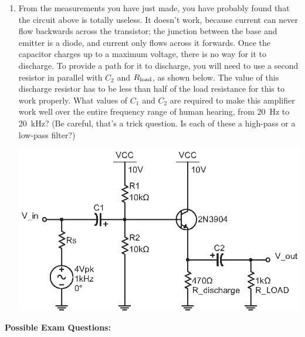 \begin{enumerate}[wide]
\item From the measurements you have just made, you have probably found that the circuit above is totally useless.  It doesn't work, because current can never flow backwards across the transistor; the junction between the base and emitter is a diode, and current only flows across it forwards. Once the capacitor charges up to a maximum voltage, there is no way for it to discharge.  To provide a path for it to discharge, you will need to use a second resistor in parallel with $C_2$ and $R_{\rm load}$, as shown below.  The value of this discharge resistor has to be less than half of the load resistance for this to work properly.  What values of $C_1$ and $C_2$ are required to make this amplifier work well over the entire frequency range of human hearing, from 20~Hz to 20~kHz?  (Be careful, that's a trick question.  Is each of these a high-pass or a low-pass filter?) \label{part_biased_output_and_input_correct}
\begin{center}
\includegraphics{bjt/biased_output_and_input_correct.eps}
\end{center}

\end{enumerate}

\textbf{Possible Exam Questions:}

